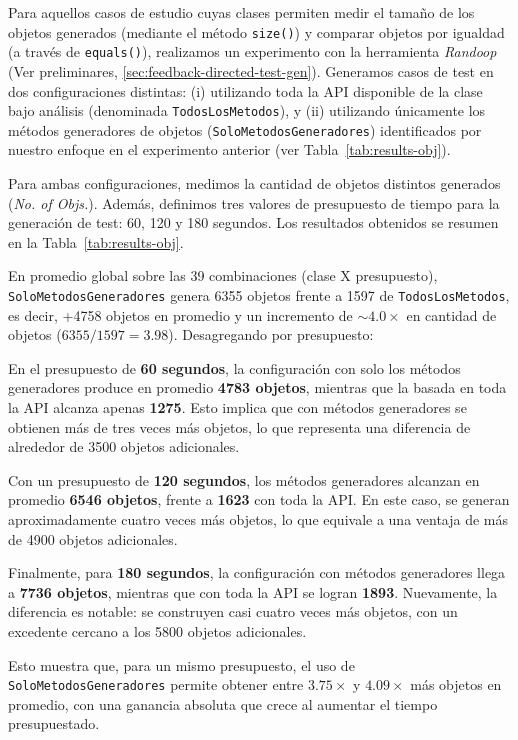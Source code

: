 Para aquellos casos de estudio cuyas clases permiten medir el tamaño de los objetos generados 
(mediante el método \texttt{size()}) y comparar objetos por igualdad (a través de \texttt{equals()}), 
realizamos un experimento con la herramienta \emph{Randoop} (Ver preliminares, \ref{sec:feedback-directed-test-gen}). Generamos casos de test en dos 
configuraciones distintas: (i) utilizando toda la API disponible de la clase bajo análisis 
(denominada \texttt{TodosLosMetodos}), y (ii) utilizando únicamente los métodos generadores de objetos
(\texttt{SoloMetodosGeneradores}) identificados por nuestro enfoque en el experimento anterior 
(ver Tabla~\ref{tab:results-obj}).

Para ambas configuraciones, medimos la cantidad de objetos distintos 
generados (\emph{No. of Objs.}). Además, definimos tres valores de presupuesto de tiempo para la generación de 
test: 60, 120 y 180 segundos. Los resultados obtenidos se resumen en la
Tabla~\ref{tab:results-obj}.

En promedio global sobre las 39 combinaciones (clase X presupuesto),
\texttt{SoloMetodosGeneradores} genera 6355 objetos frente a 1597 de
\texttt{TodosLosMetodos}, es decir, +4758 objetos en promedio y un
incremento de \textbf{\(\sim 4.0\times\)} en cantidad de objetos (\(6355/1597=3.98\)). Desagregando por presupuesto:

En el presupuesto de \textbf{60 segundos}, la configuración con solo los 
métodos generadores produce en promedio \textbf{4783 objetos}, mientras 
que la basada en toda la API alcanza apenas \textbf{1275}. Esto implica 
que con métodos generadores se obtienen más de tres veces más objetos, 
lo que representa una diferencia de alrededor de 3500 objetos adicionales. 

Con un presupuesto de \textbf{120 segundos}, los métodos generadores 
alcanzan en promedio \textbf{6546 objetos}, frente a \textbf{1623} con 
toda la API. En este caso, se generan aproximadamente cuatro veces más 
objetos, lo que equivale a una ventaja de más de 4900 objetos adicionales. 

Finalmente, para \textbf{180 segundos}, la configuración con métodos 
generadores llega a \textbf{7736 objetos}, mientras que con toda la API 
se logran \textbf{1893}. Nuevamente, la diferencia es notable: se 
construyen casi cuatro veces más objetos, con un excedente cercano a 
los 5800 objetos adicionales.

Esto muestra que, para un mismo presupuesto, el uso de \texttt{SoloMetodosGeneradores}
permite obtener entre \(3.75\times\) y \(4.09\times\) más objetos en
promedio, con una ganancia absoluta que crece al aumentar el tiempo
presupuestado.

